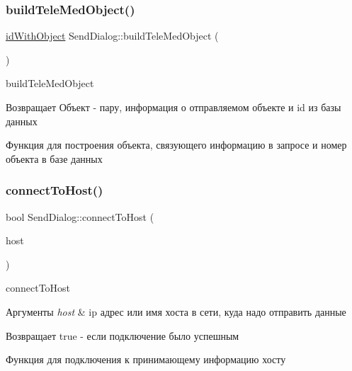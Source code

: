 \subsubsection{\texorpdfstring{build\+Tele\+Med\+Object()}{buildTeleMedObject()}}
{\footnotesize\ttfamily \hyperlink{senddialog_8h_aa9b1321518febdee7323e4994ecc1ec3}{id\+With\+Object} Send\+Dialog\+::build\+Tele\+Med\+Object (\begin{DoxyParamCaption}{ }\end{DoxyParamCaption})\hspace{0.3cm}{\ttfamily [private]}}



build\+Tele\+Med\+Object 

\begin{DoxyReturn}{Возвращает}
Объект -\/ пару, информация о отправляемом объекте и id из базы данных
\end{DoxyReturn}
Функция для построения объекта, связующего информацию в запросе и номер объекта в базе данных \mbox{\label{classSendDialog_a0bde13a7efe3bd50e9fe67a7b87b9f2c}} 
\subsubsection{\texorpdfstring{connect\+To\+Host()}{connectToHost()}}
{\footnotesize\ttfamily bool Send\+Dialog\+::connect\+To\+Host (\begin{DoxyParamCaption}\item[{const Q\+String \&}]{host }\end{DoxyParamCaption})\hspace{0.3cm}{\ttfamily [private]}}



connect\+To\+Host 


\begin{DoxyParams}{Аргументы}
{\em host} & ip адрес или имя хоста в сети, куда надо отправить данные \\
\hline
\end{DoxyParams}
\begin{DoxyReturn}{Возвращает}
true -\/ если подключение было успешным
\end{DoxyReturn}
Функция для подключения к принимающему информацию хосту \mbox{\label{classSendDialog_af8fc97ec266db98d488701a4601f1b26}} 
